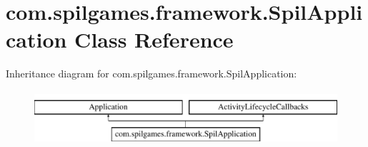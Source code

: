 \hypertarget{classcom_1_1spilgames_1_1framework_1_1_spil_application}{\section{com.\-spilgames.\-framework.\-Spil\-Application Class Reference}
\label{classcom_1_1spilgames_1_1framework_1_1_spil_application}
}
Inheritance diagram for com.\-spilgames.\-framework.\-Spil\-Application\-:\begin{figure}[H]
\begin{center}
\leavevmode
\includegraphics[height=2.000000cm]{classcom_1_1spilgames_1_1framework_1_1_spil_application}
\end{center}
\end{figure}
